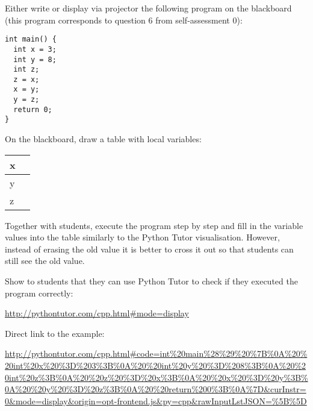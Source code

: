 Either write or display via projector the following program on the
blackboard (this program corresponds to question 6 from self-assessment
0):
\begin{lstlisting}
int main() {
  int x = 3;
  int y = 8;
  int z;
  z = x;
  x = y;
  y = z;
  return 0;
}
\end{lstlisting}

On the blackboard, draw a table with local variables:

\begin{tabular}{|l|p{2cm}|}
\hline
x &  \\ \hline
y &  \\ \hline
z &  \\ \hline
\end{tabular}

Together with students, execute the program step by step and fill in the
variable values into the table similarly to the Python Tutor
visualisation. However, instead of erasing the old value it is better to
cross it out so that students can still see the old value.

Show to students that they can use Python Tutor to check if they
executed the program correctly:

\url{http://pythontutor.com/cpp.html#mode=display}

Direct link to the example:

\url{http://pythontutor.com/cpp.html#code=int%20main%28%29%20%7B%0A%20%20int%20x%20%3D%203%3B%0A%20%20int%20y%20%3D%208%3B%0A%20%20int%20z%3B%0A%20%20z%20%3D%20x%3B%0A%20%20x%20%3D%20y%3B%0A%20%20y%20%3D%20z%3B%0A%20%20return%200%3B%0A%7D&curInstr=0&mode=display&origin=opt-frontend.js&py=cpp&rawInputLstJSON=%5B%5D}


